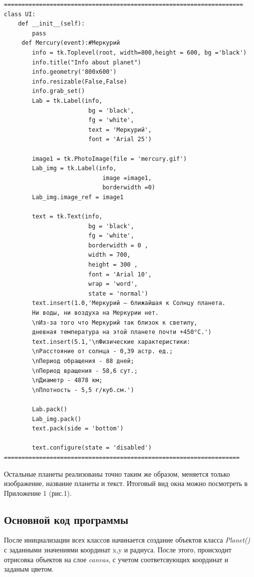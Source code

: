 \documentclass[11pt,a4paper]{report}
\begin{document}
\begin{verbatim}
====================================================================
class UI:
    def __init__(self):
        pass
     def Mercury(event):#Меркурий
        info = tk.Toplevel(root, width=800,height = 600, bg ='black')        
        info.title("Info about planet") 
        info.geometry('800x600')
        info.resizable(False,False) 
        info.grab_set()
        Lab = tk.Label(info, 
                        bg = 'black',
                        fg = 'white',
                        text = 'Меркурий', 
                        font = 'Arial 25')
                        
        image1 = tk.PhotoImage(file = 'mercury.gif')
        Lab_img = tk.Label(info,
                            image =image1,
                            borderwidth =0)
        Lab_img.image_ref = image1
        
        text = tk.Text(info,
                        bg = 'black',
                        fg = 'white', 
                        borderwidth = 0 ,
                        width = 700, 
                        height = 300 , 
                        font = 'Arial 10', 
                        wrap = 'word', 
                        state = 'normal')
        text.insert(1.0,'Меркурий — ближайшая к Солнцу планета. 
        Ни воды, ни воздуха на Меркурии нет. 
        \nИз-за того что Меркурий так близок к светилу, 
        дневная температура на этой планете почти +450°С.')
        text.insert(5.1,'\nФизические характеристики:
        \nРасстояние от солнца - 0,39 астр. ед.;
        \nПериод обращения - 88 дней;
        \nПериод вращения - 58,6 сут.;
        \nДиаметр - 4878 км;
        \nПлотность - 5,5 г/куб.см.')
        
        Lab.pack()
        Lab_img.pack()
        text.pack(side = 'bottom')
        
        text.configure(state = 'disabled')
===================================================================
\end{verbatim}

Остальные планеты реализованы точно таким же образом, меняется только изображение, название планеты и текст.
Итоговый вид окна можно посмотреть в Приложение 1 (рис.1).
\subsection{Основной код программы}
После инициализации всех классов начинается создание объектов класса \textit{Planet()} с заданными значениями координат x,y и радиуса.
После этого, происходит отрисовка объектов на слое  \textit{canvas}, с  учетом соответсвующих координат и заданым цветом. 
\end{document}
